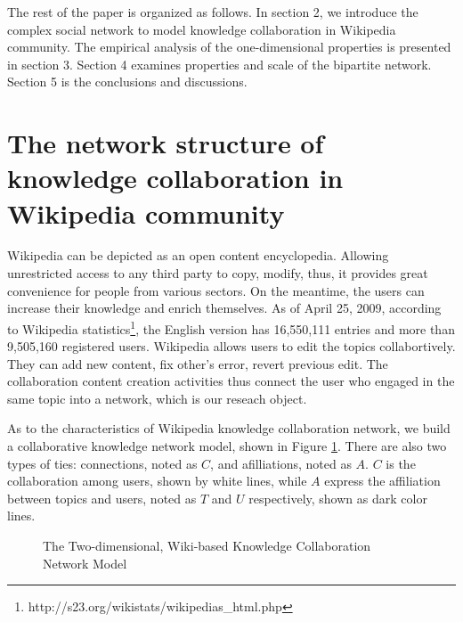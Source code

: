 \documentclass{elsarticle}
\begin{document}
The rest of the paper is organized as follows. In section 2, we
introduce the complex social network to model  knowledge
collaboration in Wikipedia community. The empirical analysis of the one-dimensional
properties is presented in section 3. Section 4 examines properties
and scale of the  bipartite network. Section 5 is
the conclusions and discussions.

\section{The network structure of knowledge collaboration in Wikipedia
community}
\label{sec:netw-struct-wiki}

 Wikipedia
can be depicted as an open content encyclopedia. Allowing unrestricted access to any third party to copy, modify,
thus, it  provides great convenience for people from various
sectors. On the meantime, the users can increase their knowledge and
enrich themselves. As of April 25, 2009, according to Wikipedia
statistics\footnote{http://s23.org/wikistats/wikipedias\_html.php}, the English version has
16,550,111 entries and more than  9,505,160 registered users. Wikipedia allows users to edit the topics collabortively. They can add
new content, fix other's error, revert previous edit. The
collaboration content creation activities thus connect the user who
engaged in the same topic into a network, which is our reseach object. 


As to the characteristics of Wikipedia knowledge collaboration
network, we build a collaborative 
knowledge network model, shown in Figure \ref{fig:two-layer}. There are also two
types of ties: connections, noted as $C$, and afilliations, noted as $A$. $C$
is the collaboration among users, shown by white lines, while
$A$ express the affiliation between topics and users, noted as $T$ and $U$ respectively, shown as dark color lines. 

\begin{figure}[h]
  
  \centering
  \scalebox{0.8}{\texttt{[image: 01]}}
  \caption{The Two-dimensional, Wiki-based Knowledge Collaboration Network Model}
  \label{fig:two-layer}
\end{figure}
\end{document}

